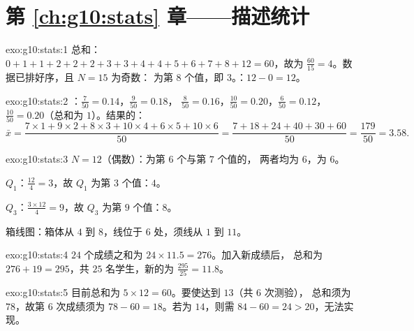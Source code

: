 \section*{第 \ref{ch:g10:stats} 章——描述统计}

\begin{solution}{exo:g10:stats:1}
总和：$0+1+1+2+2+2+3+3+4+4+5+6+7+8+12 = 60$，故为
$\frac{60}{15} = 4$。数据已排好序，且 $N = 15$ 为奇数：
为第 $8$ 个值，即 $3$。：$12 - 0 = 12$。
\end{solution}

\begin{solution}{exo:g10:stats:2}
：$\frac{7}{50} = 0.14$，$\frac{9}{50} = 0.18$，
$\frac{8}{50} = 0.16$，$\frac{10}{50} = 0.20$，$\frac{6}{50} = 0.12$，
$\frac{10}{50} = 0.20$（总和为 $1$）。结果的：
\[
\bar x = \frac{7 \times 1 + 9 \times 2 + 8 \times 3 + 10 \times 4
+ 6 \times 5 + 10 \times 6}{50}
= \frac{7 + 18 + 24 + 40 + 30 + 60}{50}
= \frac{179}{50} = 3.58 .
\]
\end{solution}

\begin{solution}{exo:g10:stats:3}
$N = 12$（偶数）：为第 $6$ 个与第 $7$ 个值的，
两者均为 $6$，为 $6$。

$Q_1$：$\frac{12}{4} = 3$，故 $Q_1$ 为第 $3$ 个值：$4$。

$Q_3$：$\frac{3 \times 12}{4} = 9$，故 $Q_3$ 为第 $9$ 个值：$8$。

箱线图：箱体从 $4$ 到 $8$，线位于 $6$ 处，须线从
$1$ 到 $11$。
\end{solution}

\begin{solution}{exo:g10:stats:4}
$24$ 个成绩之和为 $24 \times 11.5 = 276$。加入新成绩后，
总和为 $276 + 19 = 295$，共 $25$ 名学生，新的为
$\frac{295}{25} = 11.8$。
\end{solution}

\begin{solution}{exo:g10:stats:5}
目前总和为 $5 \times 12 = 60$。要使达到 $13$（共 $6$ 次测验），
总和须为 $78$，故第 $6$ 次成绩须为 $78 - 60 = 18$。若为
$14$，则需 $84 - 60 = 24 > 20$，无法实现。
\end{solution}


